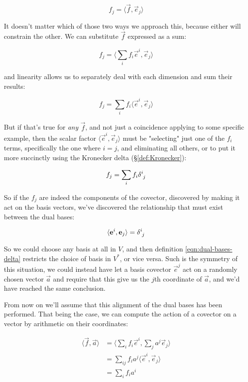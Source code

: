 $$
f_j = \langle \vec{f} , \vec{e}_j\rangle
$$

It doesn't matter which of those two ways we approach this, because either will constrain the other. We can substitute $\vec{f}$ expressed as a sum:

$$
f_j = \langle \sum_i f_i \vec{e}^i , \vec{e}_j\rangle
$$

and linearity allows us to separately deal with each dimension and sum their results:

$$
f_j = \sum_i f_i \langle \vec{e}^i , \vec{e}_j\rangle
$$

But if that's true for \textit{any} $\vec{f}$, and not just a coincidence applying to some specific example, then the scalar factor $\langle \vec{e}^i , \vec{e}_j\rangle$ must be "selecting" just one of the $f_i$ terms, specifically the one where $i = j$, and eliminating all others, or to put it more succinctly using the Kronecker delta (§\ref{def:Kronecker}):

$$
f_j = \sum_i f_i \delta \indices{^i_j}
$$

So if the $f_j$ are indeed the components of the covector, discovered by making it act on the basis vectors, we've discovered the relationship that must exist between the dual bases:

\begin{equation}
    \langle \vec{e}^i,\vec{e}_j\rangle = \delta\indices{^i_j}
    \label{eqn:dual-bases-delta}
\end{equation}

So we could choose any basis at all in $V$, and then definition \eqref{eqn:dual-bases-delta} restricts the choice of basis in $V^*$, or vice versa. Such is the symmetry of this situation, we could instead have let a basis covector $\vec{e}^j$ act on a randomly chosen vector $\vec{a}$ and require that this give us the $j$th coordinate of $\vec{a}$, and we'd have reached the same conclusion.

From now on we'll assume that this alignment of the dual bases has been performed. That being the case, we can compute the action of a covector on a vector by arithmetic on their coordinates:

\begin{equation}
    \begin{split}
        \langle \vec{f},\vec{a}\rangle 
        &= \langle \sum_i f_i \vec{e}^i , \sum_j a^j \vec{e}_j \rangle \\
        &= \sum_{ij} f_i a^j \langle\vec{e}^i,\vec{e}_j\rangle \\
        &= \sum_{i} f_i a^i
    \end{split}
\end{equation}

